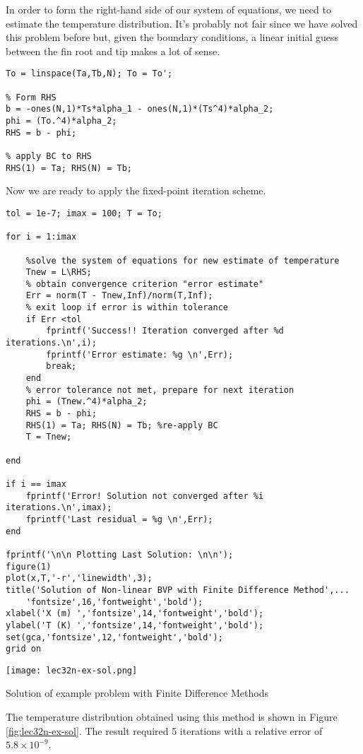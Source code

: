 In order to form the right-hand side of our system of equations, we need to estimate the temperature distribution.  It's probably not fair since we have solved this problem before but, given the boundary conditions, a linear initial guess between the fin root and tip makes a lot of sense.

\begin{lstlisting}[style=myMatlab,name=lec32n-ex]
% Estimate initial temperature distribution
To = linspace(Ta,Tb,N); To = To';

% Form RHS
b = -ones(N,1)*Ts*alpha_1 - ones(N,1)*(Ts^4)*alpha_2;
phi = (To.^4)*alpha_2;
RHS = b - phi;

% apply BC to RHS
RHS(1) = Ta; RHS(N) = Tb;

\end{lstlisting}

\noindent Now we are ready to apply the fixed-point iteration scheme.
\begin{lstlisting}[style=myMatlab,name=lec32n-ex]
tol = 1e-7; imax = 100; T = To;

for i = 1:imax

    %solve the system of equations for new estimate of temperature
    Tnew = L\RHS;     
    % obtain convergence criterion "error estimate"
    Err = norm(T - Tnew,Inf)/norm(T,Inf);    
    % exit loop if error is within tolerance
    if Err <tol
        fprintf('Success!! Iteration converged after %d iterations.\n',i);
        fprintf('Error estimate: %g \n',Err);
        break;
    end    
    % error tolerance not met, prepare for next iteration
    phi = (Tnew.^4)*alpha_2;
    RHS = b - phi;
    RHS(1) = Ta; RHS(N) = Tb; %re-apply BC   
    T = Tnew;
    
end

if i == imax
    fprintf('Error! Solution not converged after %i iterations.\n',imax);
    fprintf('Last residual = %g \n',Err);
end

fprintf('\n\n Plotting Last Solution: \n\n');
figure(1)
plot(x,T,'-r','linewidth',3);
title('Solution of Non-linear BVP with Finite Difference Method',...
    'fontsize',16,'fontweight','bold');
xlabel('X (m) ','fontsize',14,'fontweight','bold');
ylabel('T (K) ','fontsize',14,'fontweight','bold');
set(gca,'fontsize',12,'fontweight','bold');
grid on
\end{lstlisting}
\begin{marginfigure}
\texttt{[image: lec32n-ex-sol.png]}
\caption{Solution of example problem with Finite Difference Methods}
\label{fig:lec32n-ex-sol}
\end{marginfigure}
The temperature distribution obtained using this method is shown in Figure \ref{fig:lec32n-ex-sol}.  The result required 5 iterations with a relative error of $5.8\times 10^{-9}$.
